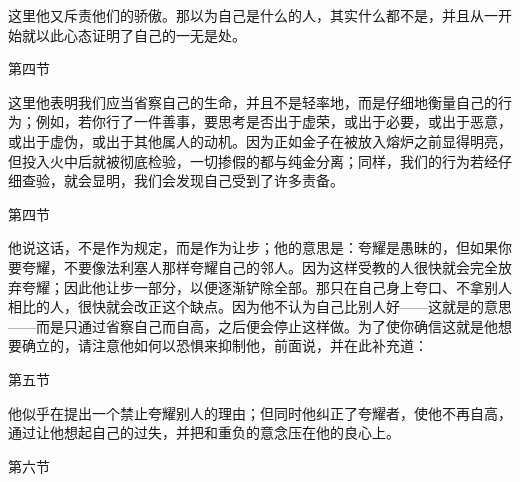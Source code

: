 这里他又斥责他们的骄傲。那以为自己是什么的人，其实什么都不是，并且从一开始就以此心态证明了自己的一无是处。\par

第四节  \par

这里他表明我们应当省察自己的生命，并且不是轻率地，而是仔细地衡量自己的行为；例如，若你行了一件善事，要思考是否出于虚荣，或出于必要，或出于恶意，或出于虚伪，或出于其他属人的动机。因为正如金子在被放入熔炉之前显得明亮，但投入火中后就被彻底检验，一切掺假的都与纯金分离；同样，我们的行为若经仔细查验，就会显明，我们会发现自己受到了许多责备。\par

第四节  \par

他说这话，不是作为规定，而是作为让步；他的意思是：夸耀是愚昧的，但如果你要夸耀，不要像法利塞人那样夸耀自己的邻人。因为这样受教的人很快就会完全放弃夸耀；因此他让步一部分，以便逐渐铲除全部。那只在自己身上夸口、不拿别人相比的人，很快就会改正这个缺点。因为他不认为自己比别人好——这就是的意思——而是只通过省察自己而自高，之后便会停止这样做。为了使你确信这就是他想要确立的，请注意他如何以恐惧来抑制他，前面说，并在此补充道：\par

第五节  \par

他似乎在提出一个禁止夸耀别人的理由；但同时他纠正了夸耀者，使他不再自高，通过让他想起自己的过失，并把和重负的意念压在他的良心上。\par

第六节  \par

